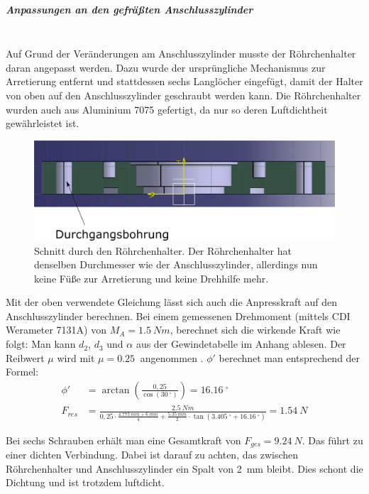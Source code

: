 \subparagraph{Anpassungen an den gefräßten Anschlusszylinder}
\hfill \\

Auf Grund der Veränderungen am Anschlusszylinder musste der Röhrchenhalter daran angepasst werden. Dazu  wurde der ursprüngliche Mechanismus zur Arretierung entfernt und stattdessen sechs Langlöcher eingefügt, damit der Halter von oben auf den Anschlusszylinder geschraubt werden kann. Die Röhrchenhalter wurden auch aus Aluminium 7075 gefertigt, da nur so deren Luftdichtheit gewährleistet ist.

\begin{figure}[h!]
	\begin{center}
		\includegraphics[scale=0.5]{Schnitt_RoehrchenhalterV2.png}
		\caption[Röhrchenhalter V2]{Schnitt durch den Röhrchenhalter. Der Röhrchenhalter hat denselben Durchmesser wie der Anschlusszylinder, allerdings nun keine Füße zur Arretierung und keine Drehhilfe mehr.}
	\end{center}
\end{figure}

Mit der oben verwendete Gleichung lässt sich auch die Anpresskraft auf den Anschlusszylinder berechnen. Bei einem gemessenen Drehmoment (mittels CDI Werameter 7131A) von $M_A = \SI{1,5}{Nm}$, berechnet sich die wirkende Kraft wie folgt: 
Man kann $d_2$, $d_3$ und $\alpha$ aus der Gewindetabelle im Anhang ablesen. Der Reibwert $\mu$ wird mit $\mu = \SI{0,25}{}$ angenommen \cite{GDV2011}. $\phi'$ berechnet man entsprechend der Formel:
\begin{align*}
	\phi' &= \arctan\left( \frac{0,25}{\cos(\SI{30}{^\circ})} \right) = \SI{16,16}{^\circ} \\
	F_{res} &= \frac{\SI{2,5}{Nm}}{0,25 \cdot \frac{\SI{4,773}{mm} + \SI{6}{mm}}{4} + \frac{\SI{5,35}{mm}}{2} \cdot \tan(\SI{3,405}{^\circ} + \SI{16,16}{^\circ})} = \SI{1,54}{N}
\end{align*}

Bei sechs Schrauben erhält man eine Gesamtkraft von $F_{ges} = \SI{9,24}{N}$. Das führt zu einer dichten Verbindung. Dabei ist darauf zu achten, das zwischen Röhrchenhalter und Anschlusszylinder ein Spalt von \SI{2}{mm} bleibt. Dies schont die Dichtung und ist trotzdem luftdicht.

